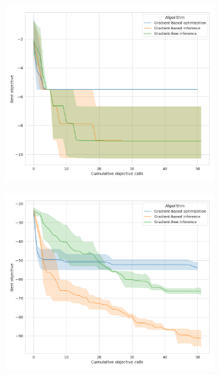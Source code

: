 \begin{figure}[tb]
    \centering
    \begin{subfigure}[t]{0.24\linewidth}
        \centering
        \includegraphics[width=\linewidth]{images/global_methods/ballistic_1.png}
    \end{subfigure}
    \begin{subfigure}[t]{0.24\linewidth}
        \centering
        \includegraphics[width=\linewidth]{images/global_methods/ballistic_10.png}
    \end{subfigure}

\end{figure}

